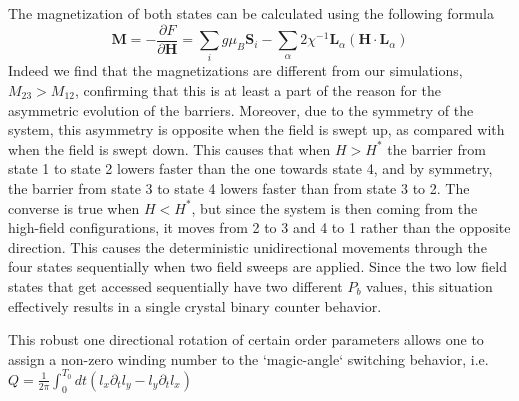 The magnetization of both states can be calculated using the following formula
\begin{equation}
	\mathbf{M} = -\frac{\partial{F}}{\partial{\mathbf{H}}} = \sum_i g \mu_{B} \mathbf{S}_i - \sum_{\alpha} 2 \chi^{-1}\mathbf{L}_{\alpha} (\mathbf{H} \cdot \mathbf{L}_{\alpha}) 
\end{equation}
Indeed we find that the magnetizations are different from our simulations, $M_{23} > M_{12}$, confirming that this is at least a part of the reason for the asymmetric evolution of the barriers.
Moreover, due to the symmetry of the system, this asymmetry is opposite when the field is swept up, as compared with when the field is swept down.
This causes that when $H > H^*$ the barrier from state 1 to state 2 lowers faster than the one towards state 4, and by symmetry, the barrier from state 3 to state 4 lowers faster than from state 3 to 2.
The converse is true when $H < H^*$, but since the system is then coming from the high-field configurations, it moves from 2 to 3 and 4 to 1 rather than the opposite direction.
This causes the deterministic unidirectional movements through the four states sequentially when two field sweeps are applied.
Since the two low field states that get accessed sequentially have two different $P_b$ values, this situation effectively results in a single crystal binary counter behavior.  

This robust one directional rotation of certain order parameters allows one to assign a non-zero winding number to the `magic-angle` switching behavior, i.e. $Q=\frac{1}{2\pi}\int_0^{T_0} dt (l_x\partial_t l_y - l_y \partial_t l_x)$ 

